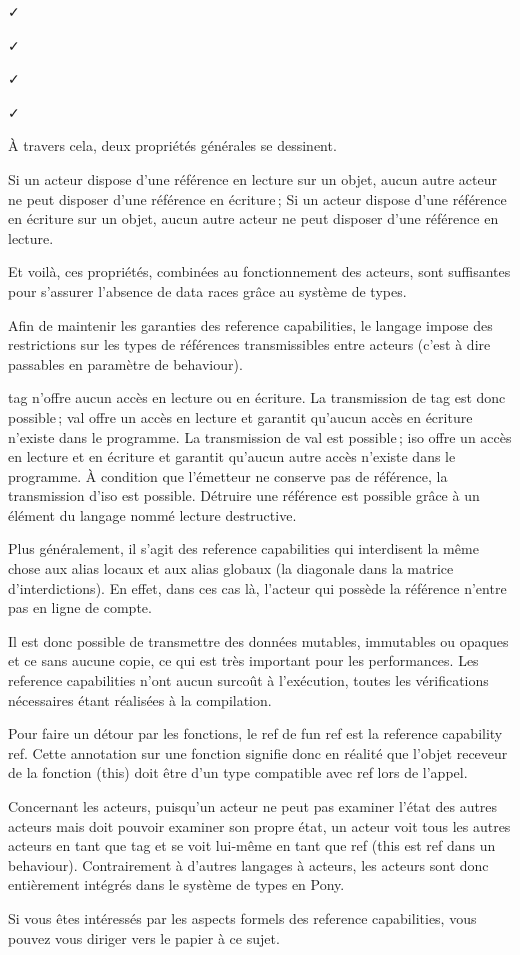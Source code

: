 \documentclass[11pt, oneside]{article}   	%
\begin{document}
✓
	

✓
	

✓
	

✓

À travers cela, deux propriétés générales se dessinent.

    Si un acteur dispose d’une référence en lecture sur un objet, aucun autre acteur ne peut disposer d’une référence en écriture ;
    Si un acteur dispose d’une référence en écriture sur un objet, aucun autre acteur ne peut disposer d’une référence en lecture.

Et voilà, ces propriétés, combinées au fonctionnement des acteurs, sont suffisantes pour s’assurer l’absence de data races grâce au système de types.

Afin de maintenir les garanties des reference capabilities, le langage impose des restrictions sur les types de références transmissibles entre acteurs (c’est à dire passables en paramètre de behaviour).

    tag n’offre aucun accès en lecture ou en écriture. La transmission de tag est donc possible ;
    val offre un accès en lecture et garantit qu’aucun accès en écriture n’existe dans le programme. La transmission de val est possible ;
    iso offre un accès en lecture et en écriture et garantit qu’aucun autre accès n’existe dans le programme. À condition que l’émetteur ne conserve pas de référence, la transmission d’iso est possible. Détruire une référence est possible grâce à un élément du langage nommé lecture destructive.

Plus généralement, il s’agit des reference capabilities qui interdisent la même chose aux alias locaux et aux alias globaux (la diagonale dans la matrice d’interdictions). En effet, dans ces cas là, l’acteur qui possède la référence n’entre pas en ligne de compte.

Il est donc possible de transmettre des données mutables, immutables ou opaques et ce sans aucune copie, ce qui est très important pour les performances. Les reference capabilities n’ont aucun surcoût à l’exécution, toutes les vérifications nécessaires étant réalisées à la compilation.

Pour faire un détour par les fonctions, le ref de fun ref est la reference capability ref. Cette annotation sur une fonction signifie donc en réalité que l’objet receveur de la fonction (this) doit être d’un type compatible avec ref lors de l’appel.

Concernant les acteurs, puisqu’un acteur ne peut pas examiner l’état des autres acteurs mais doit pouvoir examiner son propre état, un acteur voit tous les autres acteurs en tant que tag et se voit lui-même en tant que ref (this est ref dans un behaviour). Contrairement à d’autres langages à acteurs, les acteurs sont donc entièrement intégrés dans le système de types en Pony.

Si vous êtes intéressés par les aspects formels des reference capabilities, vous pouvez vous diriger vers le papier à ce sujet.
\end{document}
